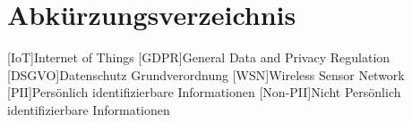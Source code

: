 
\section*{Abkürzungsverzeichnis}

\begin{acronym}[IoT]

[IoT]{Internet of Things}
[GDPR]{General Data and Privacy Regulation}
[DSGVO]{Datenschutz Grundverordnung}
[WSN]{Wireless Sensor Network}
[PII]{Persönlich identifizierbare Informationen}
[Non-PII]{Nicht Persönlich identifizierbare Informationen}

\end{acronym}